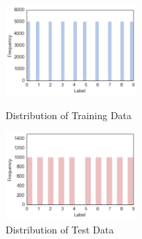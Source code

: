 \begin{figure}[h]
\begin{minipage}{0.5\hsize}
	\begin{center}
	\includegraphics[width=5cm]{picture/Distribution_of_Training_Data.png}
	\end{center}
	\caption{Distribution of Training Data}
	\label{fig:three}
\end{minipage}
\begin{minipage}{0.5\hsize}
\begin{center}
\includegraphics[width=5cm]{picture/Distribution_of_Test_Data.png}
\end{center}
 \caption{Distribution of Test Data}
  \label{fig:four}
 \end{minipage}
\end{figure}

